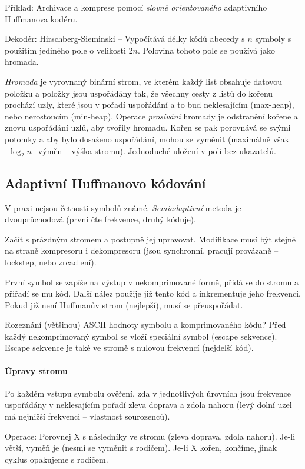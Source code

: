 \documentclass[a4paper, 11pt]{report}
\begin{document}
Příklad: Archivace a komprese pomocí \emph{slovně orientovaného} adaptivního Huffmanova kodéru.

Dekodér: Hirschberg-Sieminski -- Vypočítává délky kódů abecedy s $n$ symboly s použitím  jediného pole o velikosti $2n$. Polovina tohoto pole se používá jako hromada.

\emph{Hromada} je vyrovnaný binární strom, ve kterém každý list obsahuje datovou položku a položky jsou uspořádány tak, že všechny cesty z listů do kořenu prochází uzly, které jsou v pořadí uspořádání a to buď neklesajícím (max-heap), nebo nerostoucím (min-heap). Operace \emph{prosívání} hromady je odstranění kořene a znovu uspořádání uzlů, aby tvořily hromadu. Kořen se pak porovnává se svými potomky a aby bylo dosaženo uspořádání, mohou se vyměnit (maximálně však $\lceil \log_2 n \rceil$ výměn -- výška stromu).  Jednoduché uložení v poli bez ukazatelů.

\subsection{Adaptivní Huffmanovo kódování}
V praxi nejsou četnosti symbolů známé. \emph{Semiadaptivní} metoda je dvouprůchodová (první čte frekvence, druhý kóduje).

Začít s prázdným stromem a postupně jej upravovat. Modifikace musí být stejné na straně kompresoru i dekompresoru (jsou synchronní, pracují provázaně -- lockstep, nebo zrcadlení).

První symbol se zapíše na výstup v nekomprimované formě, přidá se do stromu a přiřadí se mu kód. Další nález použije již tento kód a inkrementuje jeho frekvenci. Pokud již není Huffmanův strom (nejlepší), musí se přeuspořádat.

Rozeznání (většinou) ASCII hodnoty symbolu a komprimovaného kódu? Před každý nekomprimovaný symbol se vloží speciální symbol (escape sekvence). Escape sekvence je také ve stromě s nulovou frekvencí (nejdelší kód).

\paragraph{Úpravy stromu}
Po každém vstupu symbolu ověření, zda v jednotlivých úrovních jsou frekvence uspořádány v neklesajícím pořadí zleva doprava a zdola nahoru (levý dolní uzel má nejnižší frekvenci -- vlastnost sourozenců).

Operace: Porovnej X s následníky ve stromu (zleva doprava, zdola nahoru). Je-li větší, vyměň je (nesmí se vyměnit s rodičem). Je-li X kořen, končíme, jinak cyklus opakujeme s rodičem.
\end{document}
